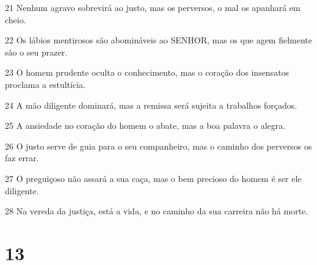 \par 21 Nenhum agravo sobrevirá ao justo, mas os perversos, o mal os apanhará em cheio.
\par 22 Os lábios mentirosos são abomináveis ao SENHOR, mas os que agem fielmente são o seu prazer.
\par 23 O homem prudente oculta o conhecimento, mas o coração dos insensatos proclama a estultícia.
\par 24 A mão diligente dominará, mas a remissa será sujeita a trabalhos forçados.
\par 25 A ansiedade no coração do homem o abate, mas a boa palavra o alegra.
\par 26 O justo serve de guia para o seu companheiro, mas o caminho dos perversos os faz errar.
\par 27 O preguiçoso não assará a sua caça, mas o bem precioso do homem é ser ele diligente.
\par 28 Na vereda da justiça, está a vida, e no caminho da sua carreira não há morte.

\chapter{13}


